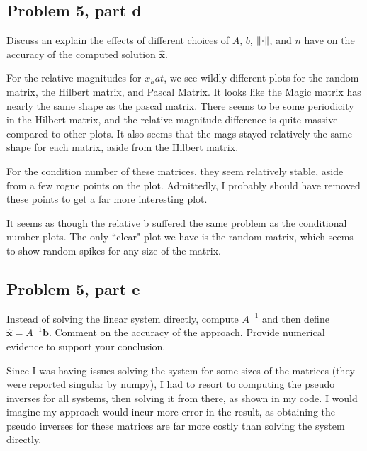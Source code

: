 \subsection{Problem 5, part d}
Discuss an explain the effects of different choices of $A$, $b$, $\norm{\cdot}$, and $n$ have on the accuracy of the computed solution $\hat{\textbf{x}}$.
\partbreak
\begin{solution}

    For the relative magnitudes for $x_hat$, we see wildly different plots for the random matrix, the Hilbert matrix, and Pascal Matrix. It looks like the Magic matrix has nearly the same shape as the pascal matrix. There seems to be some periodicity in the Hilbert matrix, and the relative magnitude difference is quite massive compared to other plots. It also seems that the mags stayed relatively the same shape for each matrix, aside from the Hilbert matrix.\par 

    For the condition number of these matrices, they seem relatively stable, aside from a few rogue points on the plot. Admittedly, I probably should have removed these points to get a far more interesting plot. \par

    It seems as though the relative b suffered the same problem as the conditional number plots. The only ``clear" plot we have is the random matrix, which seems to show random spikes for any size of the matrix.
\end{solution}

\newpage
\subsection{Problem 5, part e}
Instead of solving the linear system directly, compute $A^{-1}$ and then define $\hat{\textbf{x}} = A^{-1} \textbf{b}$. Comment on the accuracy of the approach. Provide numerical evidence to support your conclusion.
\partbreak
\begin{solution}

    Since I was having issues solving the system for some sizes of the matrices (they were reported singular by numpy), I had to resort to computing the pseudo inverses for all systems, then solving it from there, as shown in my code. I would imagine my approach would incur more error in the result, as obtaining the pseudo inverses for these matrices are far more costly than solving the system directly. 
\end{solution}

